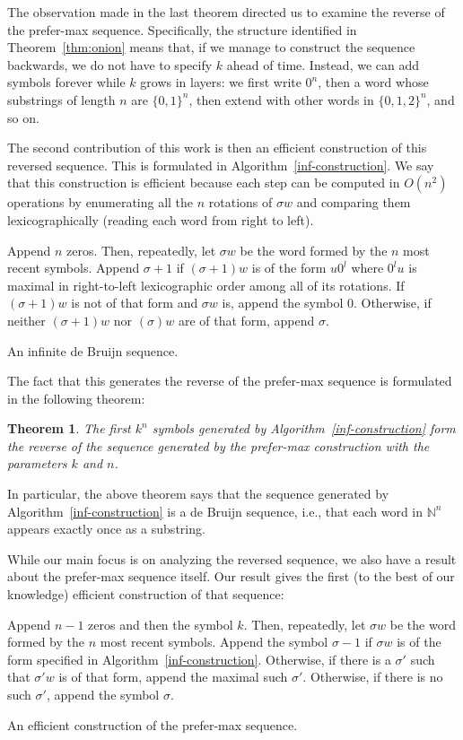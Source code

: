 \documentclass{article}
\newtheorem{theorem}{Theorem}
\theoremstyle{definition}
\newcommand{\N}{{\mathbb{N}}}
\begin{document}
The observation made in the last theorem directed us to examine the reverse of the prefer-max sequence. Specifically, the structure identified in Theorem~\ref{thm:onion} means that, if we manage to construct the sequence backwards, we do not have to specify $k$ ahead of time. Instead, we can add symbols forever while $k$ grows in layers: we first write $0^n$, then a word whose substrings of length $n$ are $\{0,1\}^n$, then extend with other words in $\{0,1,2\}^n$, and so on.

The second contribution of this work is then an efficient construction of this reversed sequence. This is formulated in Algorithm~\ref{inf-construction}. We say that this construction is efficient because each step can be computed in $O(n^2)$ operations by enumerating all the $n$ rotations of $\sigma w$ and comparing them lexicographically (reading each word from right to left).


\begin{algorithm}[!h]
	Append $n$ zeros. Then, repeatedly, let $\sigma w$ be the word formed by the $n$ most recent symbols. Append $\sigma+1$ if $(\sigma+1)w$ is of the form $u0^l$ where $0^lu$ is maximal in right-to-left lexicographic order among all of its rotations. If $(\sigma+1)w$ is not of that form and $\sigma w$ is, append the symbol $0$. Otherwise, if neither $(\sigma+1)w$ nor $(\sigma)w$ are of that form, append $\sigma$.
	\caption{An infinite de Bruijn sequence.}
	\label{inf-construction}
\end{algorithm}

The fact that this generates the reverse of the prefer-max sequence is formulated in the following theorem:
 
\begin{theorem} 
The first $k^n$ symbols generated by Algorithm~\ref{inf-construction} form the reverse of the sequence generated by the prefer-max construction with the parameters $k$ and $n$.	
\end{theorem} 

In particular, the above theorem says that the sequence generated by Algorithm~\ref{inf-construction} is a de Bruijn sequence, i.e., that each word in $\N^n$ appears exactly once as a substring.

While our main focus is on analyzing the reversed sequence, we also have a result about the prefer-max sequence itself. Our result gives the first (to the best of our knowledge) efficient construction of that sequence:

\begin{algorithm}
	Append $n-1$ zeros and then the symbol $k$. Then, repeatedly, let $\sigma w$ be the word formed by the $n$ most recent symbols. Append the symbol $\sigma-1$  if $\sigma w$  is of the form specified in Algorithm~\ref{inf-construction}. Otherwise, if there is a  $\sigma'$ such that $\sigma'w$ is of that form, append the maximal such $\sigma'$. Otherwise, if there is no such $\sigma'$, append the symbol $\sigma$.
		
	\caption{An efficient construction of the prefer-max sequence.}
	\label{efficient-pref-max}
\end{algorithm}
\end{document}
